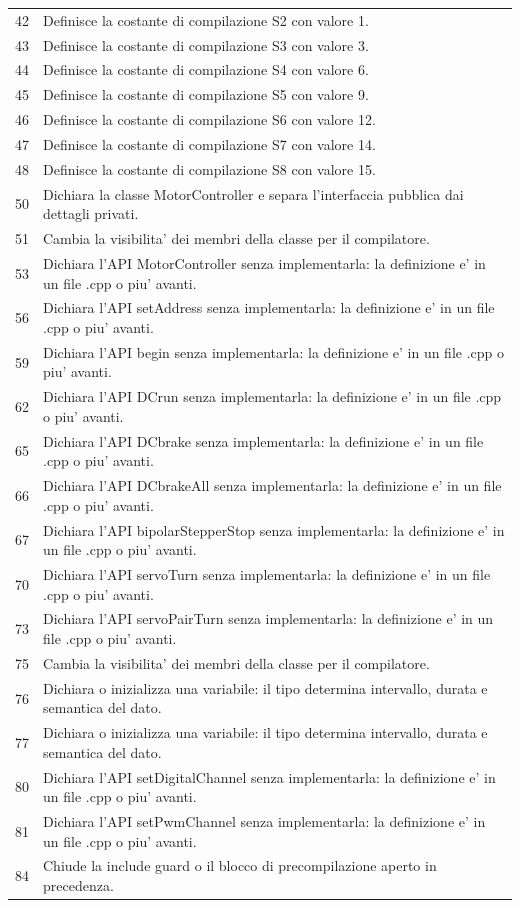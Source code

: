 \documentclass[11pt,a4paper]{article}
\begin{document}
\begin{longtable}{p{}p{}}
42 & Definisce la costante di compilazione S2 con valore 1. \\
43 & Definisce la costante di compilazione S3 con valore 3. \\
44 & Definisce la costante di compilazione S4 con valore 6. \\
45 & Definisce la costante di compilazione S5 con valore 9. \\
46 & Definisce la costante di compilazione S6 con valore 12. \\
47 & Definisce la costante di compilazione S7 con valore 14. \\
48 & Definisce la costante di compilazione S8 con valore 15. \\
50 & Dichiara la classe MotorController e separa l'interfaccia pubblica dai dettagli privati. \\
51 & Cambia la visibilita' dei membri della classe per il compilatore. \\
53 & Dichiara l'API MotorController senza implementarla: la definizione e' in un file .cpp o piu' avanti. \\
56 & Dichiara l'API setAddress senza implementarla: la definizione e' in un file .cpp o piu' avanti. \\
59 & Dichiara l'API begin senza implementarla: la definizione e' in un file .cpp o piu' avanti. \\
62 & Dichiara l'API DCrun senza implementarla: la definizione e' in un file .cpp o piu' avanti. \\
65 & Dichiara l'API DCbrake senza implementarla: la definizione e' in un file .cpp o piu' avanti. \\
66 & Dichiara l'API DCbrakeAll senza implementarla: la definizione e' in un file .cpp o piu' avanti. \\
67 & Dichiara l'API bipolarStepperStop senza implementarla: la definizione e' in un file .cpp o piu' avanti. \\
70 & Dichiara l'API servoTurn senza implementarla: la definizione e' in un file .cpp o piu' avanti. \\
73 & Dichiara l'API servoPairTurn senza implementarla: la definizione e' in un file .cpp o piu' avanti. \\
75 & Cambia la visibilita' dei membri della classe per il compilatore. \\
76 & Dichiara o inizializza una variabile: il tipo determina intervallo, durata e semantica del dato. \\
77 & Dichiara o inizializza una variabile: il tipo determina intervallo, durata e semantica del dato. \\
80 & Dichiara l'API setDigitalChannel senza implementarla: la definizione e' in un file .cpp o piu' avanti. \\
81 & Dichiara l'API setPwmChannel senza implementarla: la definizione e' in un file .cpp o piu' avanti. \\
84 & Chiude la include guard o il blocco di precompilazione aperto in precedenza. \\
\bottomrule
\end{longtable}
\end{document}
